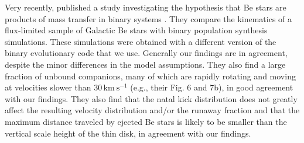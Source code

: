 \documentclass{aa}
\newcommand{\kms}{{\mathrm{km\ s^{-1}}}}
\DeclareRobustCommand{\Secref}[1]{Sec.~\ref{#1}}
\begin{document}

Very recently, \cite{boubert:18} published a study  investigating  the hypothesis that Be stars are products of mass transfer in binary systems \citep[e.g.][]{pols:91, demink:13}.  They %
compare the  kinematics of a flux-limited sample of Galactic Be stars
with binary population synthesis simulations. These simulations were
obtained with a different version of the  binary evolutionary code that we use. Generally our findings are in agreement, despite the minor differences in the model assumptions. They also find a large fraction of unbound companions, many of which are rapidly rotating and moving at velocities slower than $30\,\kms$ (e.g., their Fig. 6 and 7b), in good agreement with our findings.   They also find that the natal kick distribution does not greatly affect the resulting velocity distribution and/or the runaway fraction and that the maximum distance traveled by ejected Be stars is likely to be smaller than the vertical scale height of the thin disk, in agreement with our findings. 
\end{document}
